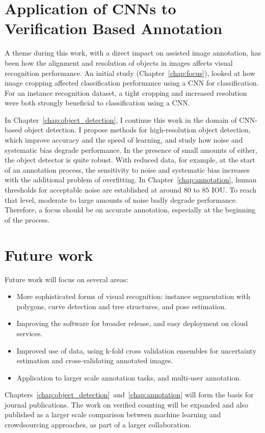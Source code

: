 \section{Application of \texorpdfstring{\gls{CNN}s}{} to Verification Based Annotation}

A theme during this work, with a direct impact on assisted image annotation, has been how the alignment and resolution of objects in images affects visual recognition performance. An initial study (Chapter~\ref{chap:focus}), looked at how image cropping affected classification performance using a \gls{CNN} for classification. For an instance recognition dataset, a tight cropping and increased resolution were both strongly beneficial to classification using a \gls{CNN}. 

In Chapter~\ref{chap:object_detection}, I continue this work in the domain of \gls{CNN}-based object detection. I propose methods for high-resolution object detection, which improve accuracy and the speed of learning, and study how noise and systematic bias degrade performance. In the presence of small amounts of either, the object detector is quite robust. With reduced data, for example, at the start of an annotation process, the sensitivity to noise and systematic bias increases with the additional problem of overfitting. In Chapter~\ref{chap:annotation}, human thresholds for acceptable noise are established at around $80$ to $85$ \gls{IOU}. To reach that level, moderate to large amounts of noise badly degrade performance. Therefore, a focus should be on accurate annotation, especially at the beginning of the process.

\section {Future work}

Future work will focus on several areas: 

\begin{itemize}
    \item More sophisticated forms of visual recognition: instance segmentation with polygons, curve detection and tree structures, and pose estimation.
    \item Improving the software for broader release, and easy deployment on cloud services.
    \item Improved use of data, using k-fold cross validation ensembles for uncertainty estimation and cross-validating annotated images.
    \item Application to larger scale annotation tasks, and multi-user annotation.
\end{itemize}


 Chapters~\ref{chap:object_detection}~and~\ref{chap:annotation} will form the basis for journal publications. The work on verified counting will be expanded and also published as a larger scale comparison between machine learning and crowdsourcing approaches, as part of a larger collaboration.






